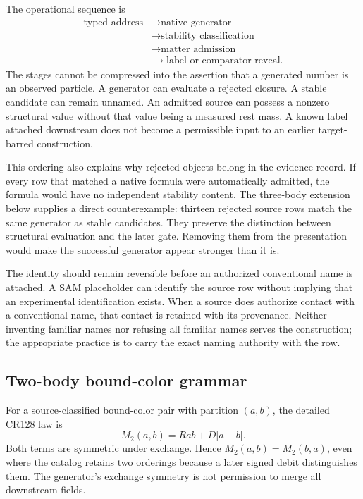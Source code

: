 The operational sequence is
\begin{equation}
\begin{split}
\text{typed address}&\longrightarrow\text{native generator}\\
&\longrightarrow\text{stability classification}\\
&\longrightarrow\text{matter admission}\\
&\longrightarrow\text{label or comparator reveal}.
\end{split}
\label{v2c2:pipeline}
\end{equation}
The stages cannot be compressed into the assertion that a generated number is an observed particle. A generator can evaluate a rejected closure. A stable candidate can remain unnamed. An admitted source can possess a nonzero structural value without that value being a measured rest mass. A known label attached downstream does not become a permissible input to an earlier target-barred construction.

This ordering also explains why rejected objects belong in the evidence record. If every row that matched a native formula were automatically admitted, the formula would have no independent stability content. The three-body extension below supplies a direct counterexample: thirteen rejected source rows match the same generator as stable candidates. They preserve the distinction between structural evaluation and the later gate. Removing them from the presentation would make the successful generator appear stronger than it is.

The identity should remain reversible before an authorized conventional name is attached. A SAM placeholder can identify the source row without implying that an experimental identification exists. When a source does authorize contact with a conventional name, that contact is retained with its provenance. Neither inventing familiar names nor refusing all familiar names serves the construction; the appropriate practice is to carry the exact naming authority with the row.

\subsection{Two-body bound-color grammar}

For a source-classified bound-color pair with partition $(a,b)$, the detailed CR128 law is
\begin{equation}
M_2(a,b)=Rab+D|a-b|.
\label{v2c2:pair}
\end{equation}
Both terms are symmetric under exchange. Hence $M_2(a,b)=M_2(b,a)$, even where the catalog retains two orderings because a later signed debit distinguishes them. The generator's exchange symmetry is not permission to merge all downstream fields.

